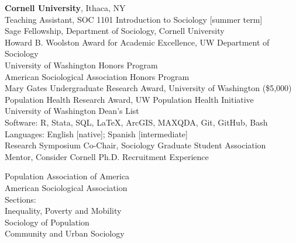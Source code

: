 \documentclass[11pt]{article} %
\begin{document}
\textbf{Cornell University}, Ithaca, NY \\
 Teaching Assistant, SOC 1101 Introduction to Sociology [summer term] \\

 Sage Fellowship, Department of Sociology, Cornell University \\
 Howard B. Woolston Award for Academic Excellence, UW Department of Sociology \\
 University of Washington Honors Program \\
 American Sociological Association Honors Program \\
 Mary Gates Undergraduate Research Award, University of Washington (\$5,000)	\\	
 Population Health Research Award, UW Population Health Initiative 	\\
 University of Washington Dean’s List \\					     

Software: R, Stata, SQL, \LaTeX, ArcGIS, MAXQDA, Git, GitHub, Bash \\
Languages: English [native]; Spanish [intermediate] \\

 Research Symposium Co-Chair, Sociology Graduate Student Association \\
 Mentor, Consider Cornell Ph.D. Recruitment Experience \\
\smallskip 

Population Association of America \\
American Sociological Association \\
Sections: \\
\hspace*{10mm} Inequality, Poverty and Mobility \\
\hspace*{10mm} Sociology of Population \\
\hspace*{10mm} Community and Urban Sociology \\
\end{document}
